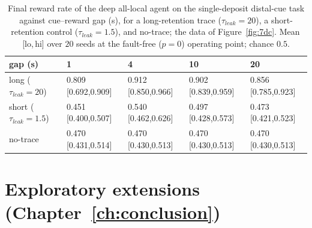 \begin{table}[H]
    \caption[Source data: retention-as-asset distal-cue control (Fig.~\ref{fig:7dc}).]{Final
    reward rate of the deep all-local agent on the single-deposit distal-cue task
    against cue--reward gap (s), for a long-retention trace ($\tau_{leak}=20$), a
    short-retention control ($\tau_{leak}=1.5$), and no-trace; the data of
    Figure~\ref{fig:7dc}. Mean\,[lo,\,hi] over $20$ seeds at the fault-free ($p=0$)
    operating point; chance $0.5$.}
    \begin{center}
    \footnotesize
    \begin{tabularx}{\textwidth}{@{}l *{4}{Y}@{}}
    \toprule
    gap (s) & 1 & 4 & 10 & 20 \\
    \midrule
    long ($\tau_{leak}{=}20$)  & 0.809\,\tiny[0.692,0.909] & 0.912\,\tiny[0.850,0.966] & 0.902\,\tiny[0.839,0.959] & 0.856\,\tiny[0.785,0.923] \\
    short ($\tau_{leak}{=}1.5$) & 0.451\,\tiny[0.400,0.507] & 0.540\,\tiny[0.462,0.626] & 0.497\,\tiny[0.428,0.573] & 0.473\,\tiny[0.421,0.523] \\
    no-trace                   & 0.470\,\tiny[0.431,0.514] & 0.470\,\tiny[0.430,0.513] & 0.470\,\tiny[0.430,0.513] & 0.470\,\tiny[0.430,0.513] \\
    \bottomrule
    \end{tabularx}
    \label{table:E9}
    \end{center}
    \vspace*{-\baselineskip}
\end{table}

\section{Exploratory extensions (Chapter~\ref{ch:conclusion})}

